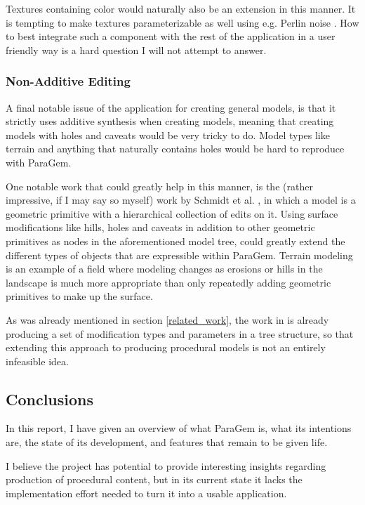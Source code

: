 \documentclass[english]{article}
\begin{document}
Textures containing color would naturally also be an extension in this manner. It is tempting to make textures parameterizable as well using e.g. Perlin noise \cite{perlin_noise}. How to best integrate such a component with the rest of the application in a user friendly way is a hard question I will not attempt to answer.

\subsubsection{Non-Additive Editing}


A final notable issue of the application for creating general models, is that it strictly uses additive synthesis when creating models, meaning that creating models with holes and caveats would be very tricky to do. Model types like terrain and anything that naturally contains holes would be hard to reproduce with ParaGem.

One notable work that could greatly help in this manner, is the (rather impressive, if I may say so myself) work by Schmidt et al. \cite{schmidt08}, in which a model is a geometric primitive with a hierarchical collection of edits on it. Using surface modifications like hills, holes and caveats in addition to other geometric primitives as nodes in the aforementioned model tree, could greatly extend the different types of objects that are expressible within ParaGem. Terrain modeling is an example of a field where modeling changes as erosions or hills in the landscape is much more appropriate than only repeatedly adding geometric primitives to make up the surface.

As was already mentioned in section \ref{related_work}, the work in \cite{schmidt08} is already producing a set of modification types and parameters in a tree structure, so that extending this approach to producing procedural models is not an entirely infeasible idea.

\subsection{Conclusions} \label{section_conclusion}


In this report, I have given an overview of what ParaGem is, what its intentions are, the state of its development, and features that remain to be given life.

I believe the project has potential to provide interesting insights regarding production of procedural content, but in its current state it lacks the implementation effort needed to turn it into a usable application.



\end{document}
